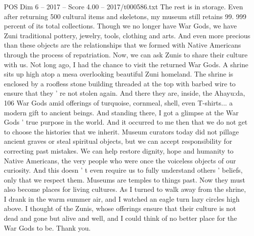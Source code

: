 \begin{textsample}{POS Dim 6 – 2017 – Score 4.00 – 2017/t000586.txt}
The rest is in storage.
Even after returning 500 cultural items and skeletons, my museum still retains 99. 999 percent of its total collections.
Though we no longer have War Gods, we have Zuni traditional pottery, jewelry, tools, clothing and arts.
And even more precious than these objects are the relationships that we formed with Native Americans through the process of repatriation.
Now, we can ask Zunis to share their culture with us.
Not long ago, I had the chance to visit the returned War Gods.
A shrine sits up high atop a mesa overlooking beautiful Zuni homeland.
The shrine is enclosed by a roofless stone building threaded at the top with barbed wire to ensure that they ' re not stolen again.
And there they are, inside, the Ahayu:da, 106 War Gods amid offerings of turquoise, cornmeal, shell, even T-shirts... a modern gift to ancient beings.
And standing there, I got a glimpse at the War Gods ' true purpose in the world.
And it occurred to me then that we do not get to choose the histories that we inherit.
Museum curators today did not pillage ancient graves or steal spiritual objects, but we can accept responsibility for correcting past mistakes.
We can help restore dignity, hope and humanity to Native Americans, the very people who were once the voiceless objects of our curiosity.
And this doesn ' t even require us to fully understand others ' beliefs, only that we respect them.
Museums are temples to things past.
Now they must also become places for living cultures.
As I turned to walk away from the shrine, I drank in the warm summer air, and I watched an eagle turn lazy circles high above.
I thought of the Zunis, whose offerings ensure that their culture is not dead and gone but alive and well, and I could think of no better place for the War Gods to be.
Thank you.

\end{textsample}
